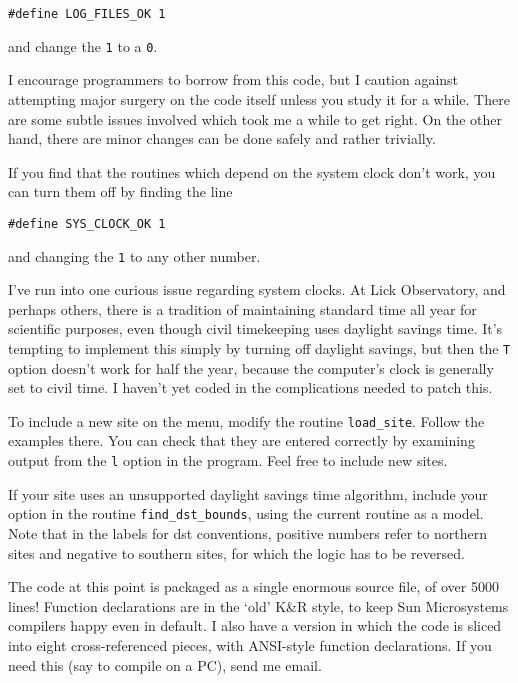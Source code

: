 {\tt \#define LOG\_FILES\_OK 1} 

and change the {\tt 1} to a {\tt 0}.


I encourage programmers to borrow from this code, but I caution
against attempting major surgery on the code itself unless
you study it for a while.   There are some subtle issues involved
which took me a while to get right.  On the other hand, there are minor
changes can be done safely and rather trivially.

If you find that the routines which depend on the system clock
don't work, you can turn them off by finding the line

{\tt \#define SYS\_CLOCK\_OK 1}

and changing the {\tt 1} to any other number.

I've run into one curious issue regarding system clocks.  At Lick
Observatory, and perhaps others, there is a tradition of maintaining 
standard time all year for scientific purposes, even though civil
timekeeping uses daylight savings time.  It's tempting to implement 
this simply by turning off daylight savings, but then the {\tt T}
option doesn't work for half the year, because the computer's clock
is generally set to civil time.  I haven't yet coded in the 
complications needed to patch this.

To include a new site on the menu, modify the routine
{\tt load\_site}.  Follow the examples there.  You can check
that they are entered correctly by examining output from 
the {\tt l} option in the program.  Feel free to include new
sites.

If your site uses an unsupported daylight savings time algorithm,
include your option in the routine {\tt find\_dst\_bounds}, using
the current routine as a model.  Note that in the labels for
dst conventions, positive numbers refer to northern sites and
negative to southern sites, for which the logic has to be reversed.

The code at this point is packaged as a single enormous source
file, of over 5000 lines!  Function declarations are in the
`old' K\&R style, to keep Sun Microsystems compilers happy
even in default.  I also have a version in which the
code is sliced into eight cross-referenced pieces, with 
ANSI-style function declarations.  If you need this (say to
compile on a PC), send me email.

\par\vfill\eject

